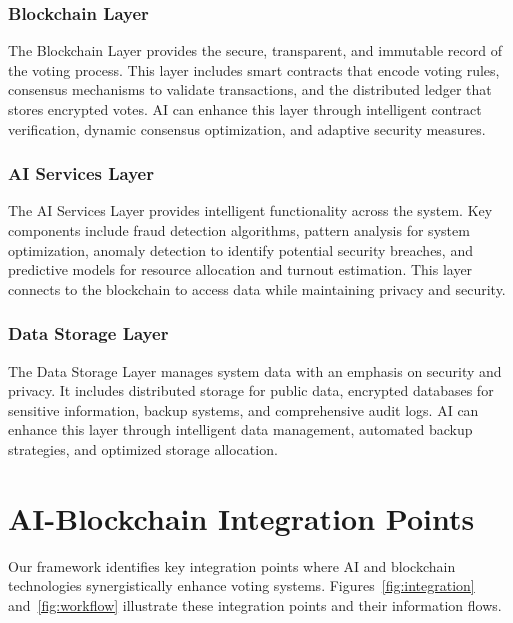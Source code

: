 \documentclass[conference]{IEEEtran}
\begin{document}
\subsubsection{Blockchain Layer}
The Blockchain Layer provides the secure, transparent, and immutable record of the voting process. This layer includes smart contracts that encode voting rules, consensus mechanisms to validate transactions, and the distributed ledger that stores encrypted votes. AI can enhance this layer through intelligent contract verification, dynamic consensus optimization, and adaptive security measures.

\subsubsection{AI Services Layer}
The AI Services Layer provides intelligent functionality across the system. Key components include fraud detection algorithms, pattern analysis for system optimization, anomaly detection to identify potential security breaches, and predictive models for resource allocation and turnout estimation. This layer connects to the blockchain to access data while maintaining privacy and security.

\subsubsection{Data Storage Layer}
The Data Storage Layer manages system data with an emphasis on security and privacy. It includes distributed storage for public data, encrypted databases for sensitive information, backup systems, and comprehensive audit logs. AI can enhance this layer through intelligent data management, automated backup strategies, and optimized storage allocation.

\section{AI-Blockchain Integration Points}
Our framework identifies key integration points where AI and blockchain technologies synergistically enhance voting systems. Figures~\ref{fig:integration} and~\ref{fig:workflow} illustrate these integration points and their information flows.
\end{document}
